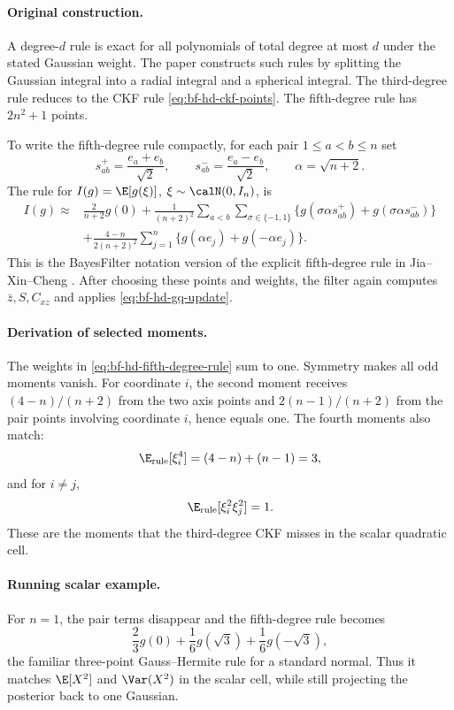 \paragraph{Original construction.}
A degree-\(d\) rule is exact for all polynomials of total degree at most \(d\)
under the stated Gaussian weight.  The paper constructs such rules by splitting
the Gaussian integral into a radial integral and a spherical integral.  The
third-degree rule reduces to the CKF rule \eqref{eq:bf-hd-ckf-points}.  The
fifth-degree rule has \(2n^2+1\) points.

To write the fifth-degree rule compactly, for each pair \(1\le a<b\le n\) set
\[
  s_{ab}^+=\frac{e_a+e_b}{\sqrt2},\qquad
  s_{ab}^-=\frac{e_a-e_b}{\sqrt2},\qquad
  \alpha=\sqrt{n+2}.
\]
The rule for \(I(g)=\E[g(\xi)]\), \(\xi\sim\calN(0,I_n)\), is
\begin{align}
  I(g)\approx&
  \frac{2}{n+2}g(0)
  +\frac{1}{(n+2)^2}
    \sum_{a<b}\sum_{\sigma\in\{-1,1\}}
    \{g(\sigma\alpha s_{ab}^+)+g(\sigma\alpha s_{ab}^-)\}
  \nonumber\\
  &+
  \frac{4-n}{2(n+2)^2}
    \sum_{j=1}^n
    \{g(\alpha e_j)+g(-\alpha e_j)\}.
  \label{eq:bf-hd-fifth-degree-rule}
\end{align}
This is the BayesFilter notation version of the explicit fifth-degree rule in
Jia--Xin--Cheng \citep[Eq. 46]{jia2013highdegree}.  After choosing these
points and weights, the filter again computes \(\bar z,S,C_{xz}\) and applies
\eqref{eq:bf-hd-gq-update}.

\paragraph{Derivation of selected moments.}
The weights in \eqref{eq:bf-hd-fifth-degree-rule} sum to one.  Symmetry makes
all odd moments vanish.  For coordinate \(i\), the second moment receives
\((4-n)/(n+2)\) from the two axis points and \(2(n-1)/(n+2)\) from the pair
points involving coordinate \(i\), hence equals one.  The fourth moments also
match:
\[
  \E_{\rm rule}[\xi_i^4]=(4-n)+(n-1)=3,
\]
and for \(i\ne j\),
\[
  \E_{\rm rule}[\xi_i^2\xi_j^2]=1.
\]
These are the moments that the third-degree CKF misses in the scalar quadratic
cell.

\paragraph{Running scalar example.}
For \(n=1\), the pair terms disappear and the fifth-degree rule becomes
\[
  \frac23 g(0)+\frac16 g(\sqrt3)+\frac16 g(-\sqrt3),
\]
the familiar three-point Gauss--Hermite rule for a standard normal.  Thus it
matches \(\E[X^2]\) and \(\Var(X^2)\) in the scalar cell, while still projecting
the posterior back to one Gaussian.

